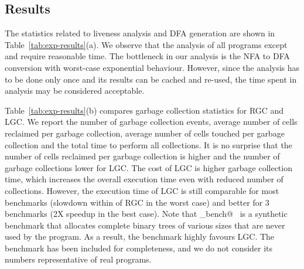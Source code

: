 \documentclass[preprint, 9pt]{sigplanconf}
\newcommand{\warning}[1]{{\color{Myred}{#1}}}
\begin{document}




\subsection{Results}

The statistics  related to  liveness analysis  and DFA  generation are
shown in Table~\ref{tab:exp-results}(a). We  observe that the analysis
of  all  programs  except \verb@treejoin@  and  \verb@sudoku@  require
reasonable time.   The bottleneck in  our analysis  is the NFA  to DFA
conversion with  worst-case exponential behaviour. However,  since the
analysis has  to be  done only  once and its  results can be cached and
re-used, the time spent in analysis may be considered acceptable.


Table~\ref{tab:exp-results}(b) compares  garbage collection statistics
for RGC and  LGC.  We report the number of  garbage collection events,
average  number of  cells  reclaimed per  garbage collection,  average
number of cells  touched per garbage collection and the  total time to
perform all collections.   It is no surprise that the  number of cells
reclaimed per garbage  collection is higher and the  number of garbage
collections  lower  for  LGC.   The  cost of  LGC  is  higher  garbage
collection time, which increases the  overall execution time even with
reduced number of  collections.  However, the execution time  of LGC is
still comparable for most benchmarks (slowdown within \warning{5X} of
RGC in the worst case) and better  for 3 benchmarks (2X speedup in the
best case).  Note that  \verb@gc_bench@~\cite{gc_bench} is a synthetic
benchmark \warning{in the no-fib suite} that allocates complete binary
trees  of various  sizes that  are  never used  by the  program. As  a
result,  the benchmark  highly favours  LGC.  The  benchmark has  been
included  for  completeness,  and  we  do  not  consider  its  numbers
representative of real programs.
\end{document}
